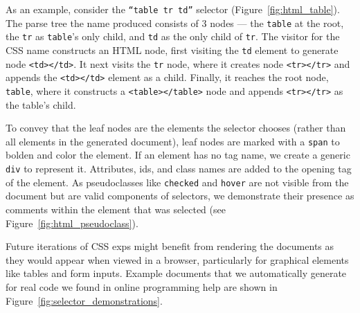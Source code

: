 As an example, consider the \texttt{``table tr td''} selector (Figure~\ref{fig:html_table}).
The parse tree the \Gls{name} produced consists of 3 nodes --- the \texttt{table} at the root, the \texttt{tr} as \texttt{table}'s only child, and \texttt{td} as the only child of \texttt{tr}.
The visitor for the CSS \Gls{name} constructs an HTML node, first visiting the \texttt{td} element to generate node \texttt{<td></td>}.
It next visits the \texttt{tr} node, where it creates node \texttt{<tr></tr>} and appends the \texttt{<td></td>} element as a child.
Finally, it reaches the root node, \texttt{table}, where it constructs a \texttt{<table></table>} node and appends \texttt{<tr></tr>} as the table's child.
\fi

To convey that the leaf nodes are the elements the selector chooses (rather than all elements in the generated document), leaf nodes are marked with a \texttt{span} to bolden and color the element.
If an element has no tag name, we create a generic \texttt{div} to represent it.
Attributes, ids, and class names are added to the opening tag of the element.
As pseudoclasses like \texttt{checked} and \texttt{hover} are not visible from the document but are valid components of selectors, we demonstrate their presence as comments within the element that was selected (see Figure~\ref{fig:html_pseudoclass}).

Future iterations of CSS \glspl{exp} might benefit from rendering the documents as they would appear when viewed in a browser, particularly for graphical elements like tables and form inputs.
Example documents that we automatically generate for real code we found in online programming help are shown in Figure~\ref{fig:selector_demonstrations}.
\fi
{}
\fi

